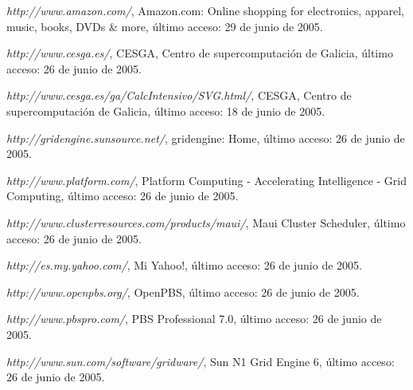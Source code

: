 \begin{thebibliography}{999}
{\it http://www.amazon.com/}, Amazon.com: Online shopping for electronics, apparel, music, books, DVDs \& more, último
acceso: 29 de junio de 2005.

{\it http://www.cesga.es/}, CESGA, Centro de supercomputación de Galicia, último acceso: 26 de junio de 2005.

{\it http://www.cesga.es/ga/CalcIntensivo/SVG.html/}, CESGA, Centro de supercomputación de Galicia, 
último acceso: 18 de junio de 2005.

{\it http://gridengine.sunsource.net/}, gridengine: Home, último acceso: 26 de junio de 2005.

{\it http://www.platform.com/}, Platform Computing - Accelerating Intelligence - Grid Computing, último acceso: 26 de junio de 2005.

{\it http://www.clusterresources.com/products/maui/}, Maui Cluster Scheduler, último acceso: 26 de junio de 2005.

{\it http://es.my.yahoo.com/}, Mi Yahoo!, último acceso: 26 de junio de 2005.

{\it http://www.openpbs.org/}, OpenPBS, último acceso: 26 de junio de 2005.

{\it http://www.pbspro.com/}, PBS Professional 7.0, último acceso: 26 de junio de 2005.

{\it http://www.sun.com/software/gridware/}, Sun N1 Grid Engine 6, último acceso: 26 de junio de 2005.
\end{thebibliography}

\cleardoublepage

\printglossary


\cleardoublepage
{}
\listoffigures
\cleardoublepage
\listoftables



